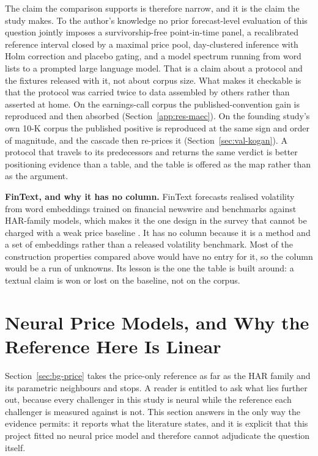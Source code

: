 The claim the comparison supports is therefore narrow, and it is the claim the
study makes. To the author's knowledge no prior forecast-level evaluation of this
question jointly imposes a survivorship-free point-in-time panel, a recalibrated
reference interval closed by a maximal price pool, day-clustered inference with
Holm correction and placebo gating, and a model spectrum running from word lists
to a prompted large language model. That is a claim about a protocol and the
fixtures released with it, not about corpus size. What makes it checkable is that
the protocol was carried twice to data assembled by others rather than asserted
at home. On the earnings-call corpus the published-convention gain is reproduced
and then absorbed (Section~\ref{app:res-maec}). On the founding study's own 10-K
corpus the published positive is reproduced at the same sign and order of
magnitude, and the cascade then re-prices it
(Section~\ref{sec:val-kogan}). %
A protocol that travels to its predecessors and returns the same verdict is
better positioning evidence than a table, and the table is offered as the map
rather than as the argument.

\textbf{FinText, and why it has no column.} FinText forecasts realised volatility
from word embeddings trained on financial newswire and benchmarks against
HAR-family models, which makes it the one design in the survey that cannot be
charged with a weak price baseline \cite{rahimikia2021fintext}. It has no column
because it is a method and a set of embeddings rather than a released volatility
benchmark. Most of the construction properties compared above would have no entry
for it, so the column would be a run of unknowns. Its lesson is the one the table
is built around: a textual claim is won or lost on the baseline, not on the
corpus.

\FloatBarrier
\section{Neural Price Models, and Why the Reference Here Is Linear}
\label{app:external:neural}

Section~\ref{sec:bg-price} takes the price-only reference as far as the HAR
family and its parametric neighbours and stops. A reader is entitled to ask what
lies further out, because every challenger in this study is neural while the
reference each challenger is measured against is not. This section answers in
the only way the evidence permits: it reports what the literature states, and it
is explicit that this project fitted no neural price model and therefore cannot
adjudicate the question itself.

